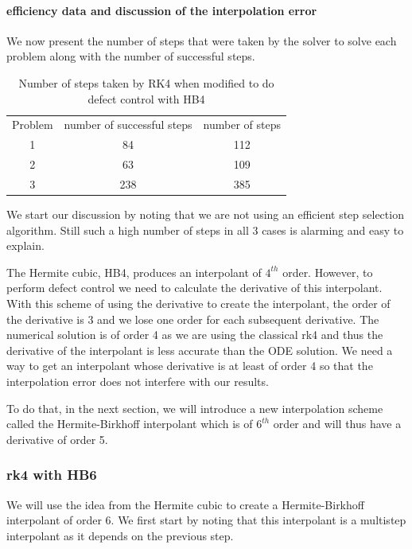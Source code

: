 \documentclass{article}
\begin{document}
\paragraph{efficiency data and discussion of the interpolation error}
We now present the number of steps that were taken by the solver to solve each problem along with the number of successful steps.

\begin{table}[h]
\caption {Number of steps taken by RK4 when modified to do defect control with HB4} \label{tab:rk4_with_hb4_nsteps}
\begin{center}
\begin{tabular}{ c c c } 
Problem & number of successful steps & number of steps \\ 
1       & 84                         & 112 \\ 
2       & 63                         & 109 \\
3       & 238                        & 385 \\
\end{tabular}
\end{center}
\end{table}

We start our discussion by noting that we are not using an efficient step selection algorithm. Still such a high number of steps in all 3 cases is alarming and easy to explain.

The Hermite cubic, HB4, produces an interpolant of $4^{th}$ order. However, to perform defect control we need to calculate the derivative of this interpolant. With this scheme of using the derivative to create the interpolant, the order of the derivative is 3 and we lose one order for each subsequent derivative. The numerical solution is of order 4 as we are using the classical rk4 and thus the derivative of the interpolant is less accurate than the ODE solution. We need a way to get an interpolant whose derivative is at least of order 4 so that the interpolation error does not interfere with our results.

To do that, in the next section, we will introduce a new interpolation scheme called the Hermite-Birkhoff interpolant which is of $6^{th}$ order and will thus have a derivative of order 5.

\subsubsection{rk4 with HB6}
We will use the idea from the Hermite cubic to create a Hermite-Birkhoff interpolant of order 6. We first start by noting that this interpolant is a multistep interpolant as it depends on the previous step.
\end{document}
